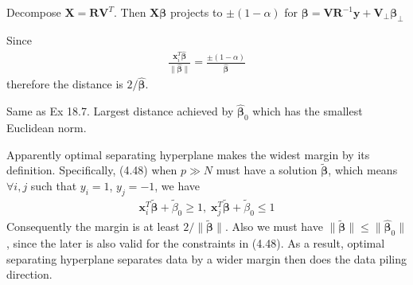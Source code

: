 \begin{exercise}
  \begin{exerciseSection}
    Decompose $\mathbf{X} = \mathbf{RV}^T$. Then $\mathbf{X}\bm{\beta}$ projects
    to $\pm(1-\alpha)$ for $\bm{\beta} = \mathbf{VR}^{-1}\mathbf{y} + \mathbf{V}_{\perp}\bm{\beta}_{\perp}$
  \end{exerciseSection}
  
  \begin{exerciseSection}
    Since
    \begin{align}
      \frac{\mathbf{x}_i^T\hat{\bm{\beta}}} {\|\hat{\bm{\beta}}\|} =
      \frac{\pm(1-\alpha)}{\hat{\bm{\beta}}}
    \end{align}
    therefore the distance is $2/\hat{\bm{\beta}}$.
  \end{exerciseSection}
  
  \begin{exerciseSection}
    Same as Ex 18.7. Largest distance achieved by $\hat{\bm{\beta}}_0$ which has
    the smallest Euclidean norm.
  \end{exerciseSection}
\end{exercise}

\begin{exercise}
  Apparently optimal separating hyperplane makes the widest margin by its
  definition. Specifically, (4.48) when $p\gg N$ must have a solution
  $\tilde{\bm{\beta}}$, which means $\forall i, j$ such that $y_i = 1$,
  $y_j=-1$, we have
  \begin{align}
    \mathbf{x}_i^T\tilde{\bm{\beta}} + \tilde{\beta}_0 \geq 1,\;
    \mathbf{x}_j^T\tilde{\bm{\beta}} + \tilde{\beta}_0 \leq 1
  \end{align}
  Consequently the margin is at least $2/\|\tilde{\bm{\beta}}\|$. Also we must
  have $\|\tilde{\bm{\beta}}\| \leq \|\hat{\bm{\beta}}_0\|$, since the later is
  also valid for the constraints in (4.48). As a result, optimal separating
  hyperplane separates data by a wider margin then does the data piling
  direction.
\end{exercise}

